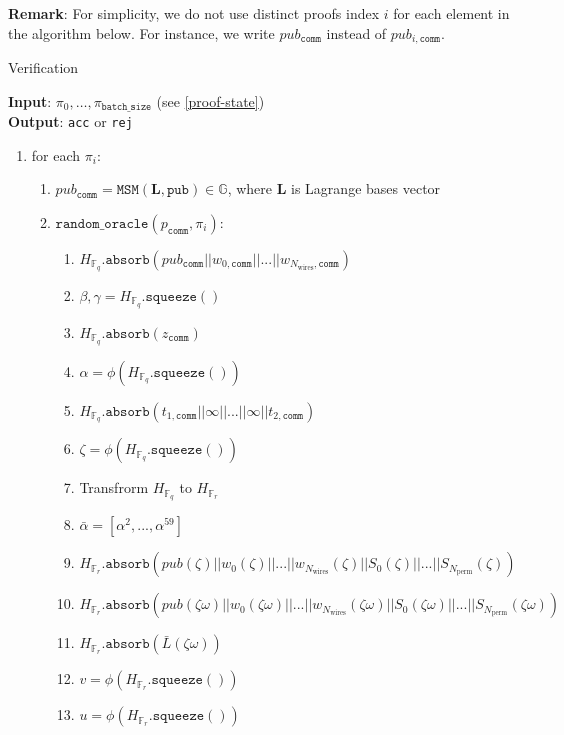 \textbf{Remark}: For simplicity, we do not use distinct proofs index $i$ for each element in the algorithm below.
For instance, we write $pub_{\texttt{comm}}$ instead of $pub_{i, \texttt{comm}}$.
\begin{algorithm}[H]
\caption{Verification}
\textbf{Input}: $\pi_0, \dots, \pi_{\texttt{batch\_size}}$ (see \ref{proof-state}) \\
\textbf{Output}: \texttt{acc} or \texttt{rej}
\begin{enumerate}
	\item for each $\pi_i$:
	\begin{enumerate}
		\item $pub_{\texttt{comm}} = \texttt{MSM}(\textbf{L}, \texttt{pub}) \in \mathbb{G}$, where $\textbf{L}$ is Lagrange bases vector
		\item $\texttt{random\_oracle}(p_{\texttt{comm}}, \pi_i)$:
		\begin{enumerate}
			\item $H_{\mathbb{F}_q}.\texttt{absorb}(pub_{\texttt{comm}} || w_{0, \texttt{comm}} || ... || w_{N_{\text{wires}}, \texttt{comm}})$
			\item $\beta, \gamma = H_{\mathbb{F}_q}.\texttt{squeeze}()$
			\item $H_{\mathbb{F}_q}.\texttt{absorb}(z_{\texttt{comm}})$
			\item $\alpha = \phi(H_{\mathbb{F}_q}.\texttt{squeeze}())$
			\item $H_{\mathbb{F}_q}.\texttt{absorb}(t_{1, \texttt{comm}} || \infty || ... || \infty || t_{2, \texttt{comm}})$
			\item $\zeta = \phi(H_{\mathbb{F}_q}.\texttt{squeeze}())$
			\item Transfrorm $H_{\mathbb{F}_q}$ to $H_{\mathbb{F}_r}$
			\item $\bar{\alpha} = [\alpha^2, ..., \alpha^59]$
			\item $H_{\mathbb{F}_r}.\texttt{absorb}(pub(\zeta) || w_{0}(\zeta) || ... || w_{N_{\text{wires}}}(\zeta) 
				|| S_0(\zeta) || ... || S_{N_{\text{perm}}}(\zeta))$
			\item $H_{\mathbb{F}_r}.\texttt{absorb}(pub(\zeta\omega) || w_{0}(\zeta\omega) || ... || w_{N_{\text{wires}}}(\zeta\omega) 
				|| S_0(\zeta\omega) || ... || S_{N_{\text{perm}}}(\zeta\omega))$
			\item $H_{\mathbb{F}_r}.\texttt{absorb}(\bar{L}(\zeta\omega))$
			\item $v = \phi(H_{\mathbb{F}_r}.\texttt{squeeze}())$
			\item $u = \phi(H_{\mathbb{F}_r}.\texttt{squeeze}())$

\end{enumerate}
\end{enumerate}
\end{enumerate}
\end{algorithm}
